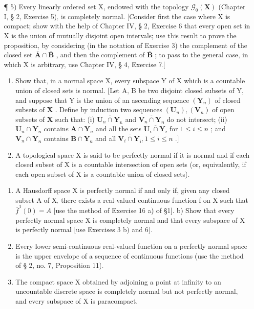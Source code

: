 ¶ 5) Every linearly ordered set X, endowed with the topology \(\mathcal{G}_{0}(\mathbf{X})\) (Chapter I, § 2, Exercise 5), is completely normal. {[}Consider first the case where X is compact; show with the help of Chapter IV, § 2, Exercise 6 that every open set in X is the union of mutually disjoint open intervals; use this result to prove the proposition, by considering (in the notation of Exercise 3) the complement of the closed set \(\overline{\mathbf{A}}\cap\overline{\mathbf{B}}\) , and then the complement of \(\overline{\mathbf{B}}\) ; to pass to the general case, in which X is arbitrary, use Chapter IV, § 4, Exercise 7.{]}

\begin{enumerate}
\def\labelenumi{\arabic{enumi})}
\setcounter{enumi}{5}
\item
  Show that, in a normal space X, every subspace Y of X which is a countable union of closed sets is normal. {[}Let A, B be two disjoint closed subsets of Y, and suppose that Y is the union of an ascending sequence \((\mathbf{Y}_n)\) of closed subsets of \(\mathbf{X}\) . Define by induction two sequences \((\mathbf{U}_n), (\mathbf{V}_n)\) of open subsets of \(\mathbf{X}\) such that: (i) \(\overline{\mathbf{U}_n \cap \mathbf{Y}_n}\) and \(\overline{\mathbf{V}_n \cap \mathbf{Y}_n}\) do not intersect; (ii) \(\mathbf{U}_n \cap \mathbf{Y}_n\) contains \(\mathbf{A} \cap \mathbf{Y}_n\) and all the sets \(\overline{\mathbf{U}_i \cap \mathbf{Y}_i}\) for \(1 \leqslant i \leqslant n\) ; and \(\mathbf{V}_n \cap \mathbf{Y}_n\) contains \(\mathbf{B} \cap \mathbf{Y}_n\) and all \(\overline{\mathbf{V}_i \cap \mathbf{Y}_i}, 1 \leqslant i \leqslant n\) .{]}
\item
  A topological space X is said to be perfectly normal if it is normal and if each closed subset of X is a countable intersection of open sets (or, equivalently, if each open subset of X is a countable union of closed sets).
\end{enumerate}

\begin{enumerate}
\def\labelenumi{\alph{enumi})}
\item
  A Hausdorff space X is perfectly normal if and only if, given any closed subset A of X, there exists a real-valued continuous function f on X such that \(\overline{f}^{1}(0)=A\) {[}use the method of Exercise 16 a) of §1{]}. b) Show that every perfectly normal space X is completely normal and that every subspace of X is perfectly normal {[}use Exercises 3 b) and 6{]}.
\item
  Every lower semi-continuous real-valued function on a perfectly normal space is the upper envelope of a sequence of continuous functions (use the method of § 2, no. 7, Proposition 11).
\item
  The compact space X obtained by adjoining a point at infinity to an uncountable discrete space is completely normal but not perfectly normal, and every subspace of X is paracompact.
\end{enumerate}

